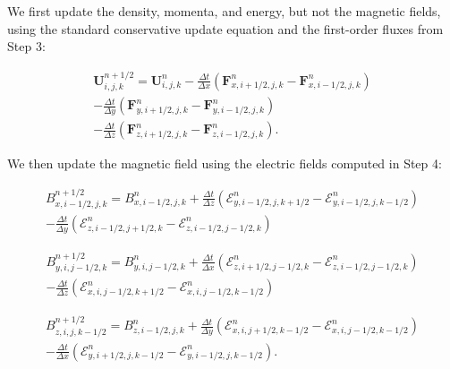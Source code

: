 We first update the density, momenta, and energy, but not the magnetic fields, using the standard conservative update equation and the first-order fluxes from Step 3:

\begin{equation}
    \begin{aligned}
        \boldsymbol{U}^{n+1/2}_{i,j,k} = \boldsymbol{U}^{n}_{i,j,k}
        - \frac{\Delta t}{\Delta x} \left( \boldsymbol{F}^n_{x,i+1/2,j,k} - \boldsymbol{F}^n_{x,i-1/2,j,k} \right) \\
        - \frac{\Delta t}{\Delta y} \left( \boldsymbol{F}^n_{y,i+1/2,j,k} - \boldsymbol{F}^n_{y,i-1/2,j,k} \right) \\
        - \frac{\Delta t}{\Delta z} \left( \boldsymbol{F}^n_{z,i+1/2,j,k} - \boldsymbol{F}^n_{z,i-1/2,j,k} \right).
    \end{aligned}
\end{equation}

We then update the magnetic field using the electric fields computed in Step 4:

\begin{equation}
    \begin{aligned}
        B^{n+1/2}_{x,i-1/2,j,k} = B^{n}_{x,i-1/2,j,k}
        + \frac{\Delta t}{\Delta z} \left( \mathcal{E}^n_{y,i-1/2,j,k+1/2} - \mathcal{E}^n_{y,i-1/2,j,k-1/2} \right) \\
        - \frac{\Delta t}{\Delta y} \left( \mathcal{E}^n_{z,i-1/2,j+1/2,k} - \mathcal{E}^n_{z,i-1/2,j-1/2,k} \right)
    \end{aligned}
\end{equation}

\begin{equation}
    \begin{aligned}
        B^{n+1/2}_{y,i,j-1/2,k} = B^{n}_{y,i,j-1/2,k}
        + \frac{\Delta t}{\Delta x} \left( \mathcal{E}^n_{z,i+1/2,j-1/2,k} - \mathcal{E}^n_{z,i-1/2,j-1/2,k} \right) \\
        - \frac{\Delta t}{\Delta z} \left( \mathcal{E}^n_{x,i,j-1/2,k+1/2} - \mathcal{E}^n_{x,i,j-1/2,k-1/2} \right)
    \end{aligned}
\end{equation}

\begin{equation}
    \begin{aligned}
        B^{n+1/2}_{z,i,j,k-1/2} = B^{n}_{z,i-1/2,j,k}
        + \frac{\Delta t}{\Delta y} \left( \mathcal{E}^n_{x,i,j+1/2,k-1/2} - \mathcal{E}^n_{x,i,j-1/2,k-1/2} \right) \\
        - \frac{\Delta t}{\Delta x} \left( \mathcal{E}^n_{y,i+1/2,j,k-1/2} - \mathcal{E}^n_{y,i-1/2,j,k-1/2} \right).
    \end{aligned}
\end{equation}

